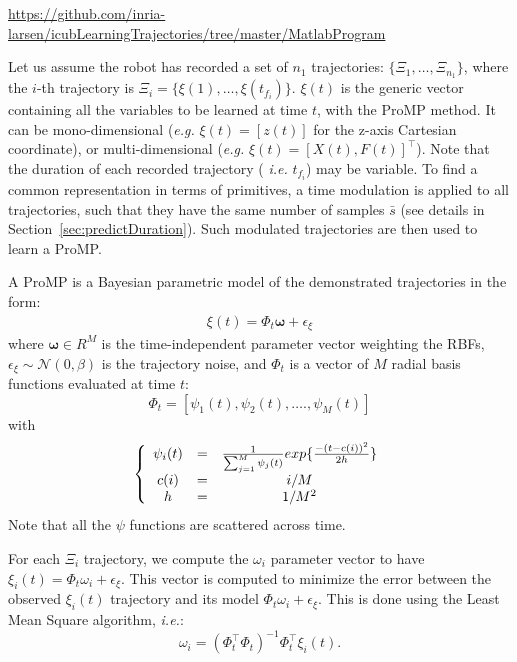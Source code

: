 \documentclass[utf8]{frontiersSCNS} %
\newcommand{\todo}[1]{\textcolor{red}{\textbf{/*#1*/}}}
\begin{document}
\url{https://github.com/inria-larsen/icubLearningTrajectories/tree/master/MatlabProgram}

Let us assume the robot has recorded a set of $n_1$ trajectories: $\{\Xi_1,\ldots, \Xi_{n_1} \}$, where the $i$-th trajectory is $\Xi_i = \{\xi(1), \ldots, \xi(t_{f_i})\}$. 
$\xi(t)$ is the generic vector containing all the variables to be learned at time $t$, with the ProMP method. It can be mono-dimensional (\textit{e.g.} $\xi(t) = [z(t)]$ for the z-axis Cartesian coordinate), or multi-dimensional (\textit{e.g.} $\xi(t) = [X(t), F(t)]^\top$). Note that the duration of each recorded trajectory (\textit{ i.e.}  $t_{f_i}$) may be variable. 
To find a common representation in terms of primitives, a time modulation is applied to all trajectories, such that they have the same number of samples $\bar{s}$ (see details in Section~\ref{sec:predictDuration}). Such modulated trajectories are then used to learn a ProMP.

A ProMP is a Bayesian parametric model of the demonstrated trajectories in the form: 
\begin{eqnarray}
\xi(t) = \Phi_t \boldsymbol{\omega} + \epsilon_\xi
\end{eqnarray}
where $\boldsymbol{\omega} \in R^M$ is the time-independent parameter vector weighting the RBFs, $\epsilon_\xi \sim \mathcal{N}(0, \beta) $ is the trajectory noise, and $\Phi_t$ is a vector of $M$ radial basis functions evaluated at time $t$:
$$ \Phi_{t}=[\psi_{1}(t), \psi_{2}(t), \ldots., \psi_{M}(t)]$$
with
\begin{equation} \label{eq:RBF}
\left\lbrace \begin{array}{cccc}
\psi_{i}(t) &=& {1 \over\sum_{j=1}^M \psi_{j}(t) }exp\{{-(t  - c(i))^2 \over {2h}}\} \\
c(i) &=& {i / M}\\
h &=& {1 / M^2}
\end{array} \right. 
\end{equation}
Note that all the $\psi$ functions are scattered across time.

For each $\Xi_i$ trajectory, we compute the $\omega_i$ parameter vector to have $\xi_i(t) = \Phi_t \omega_i + \epsilon_\xi$. This vector is computed to minimize the error between the observed $\xi_i(t)$ trajectory and its model $\Phi_t \omega_i + \epsilon_\xi$. This is done using the Least Mean Square algorithm, \textit{i.e.}:
\begin{equation} \label{eq:w}
\omega_i = (\Phi_t^\top\Phi_t)^{-1}\Phi_t^\top \xi_i(t).
\end{equation} 
\end{document}
